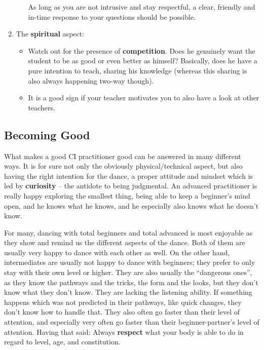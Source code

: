 \begin{enumerate}
\begin{itemize}
        As long as you are not intrusive and stay respectful, a clear, friendly and in-time response to your questions should be possible.
    \end{itemize}
    \item The \textbf{spiritual} aspect:
    \begin{itemize}
        \item Watch out for the presence of \textbf{competition}.
        Does he genuinely want the student to be as good or even better as himself?
        Basically, does he have a pure intention to teach, sharing his knowledge (whereas this sharing is also always happening two-way though).
        \item It is a good sign if your teacher motivates you to also have a look at other teachers.
    \end{itemize}
\end{enumerate}

\subsection{Becoming Good}\label{subsec:becoming-good}

What makes a good CI practitioner good can be answered in many different ways.
It is for sure not only the obviously physical/technical aspect, but also having the right intention for the dance, a proper attitude and mindset which is led by \textbf{curiosity} -- the antidote to being judgmental.
An advanced practitioner is really happy exploring the smallest thing, being able to keep a beginner's mind open, and he knows what he knows, and he especially also knows what he doesn't know.

For many, dancing with total beginners and total advanced is most enjoyable as they show and remind us the different aspects of the dance.
Both of them are usually very happy to dance with each other as well.
On the other hand, intermediates are usually not happy to dance with beginners; they prefer to only stay with their own level or higher.
They are also usually the ``dangerous ones'', as they know the pathways and the tricks, the form and the looks, but they don't know what they don't know.
They are lacking the listening ability.
If something happens which was not predicted in their pathways, like quick changes, they don't know how to handle that.
They also often go faster than their level of attention, and especially very often go faster than their beginner-partner's level of attention.
Having that said: Always \textbf{respect} what your body is able to do in regard to level, age, and constitution.

